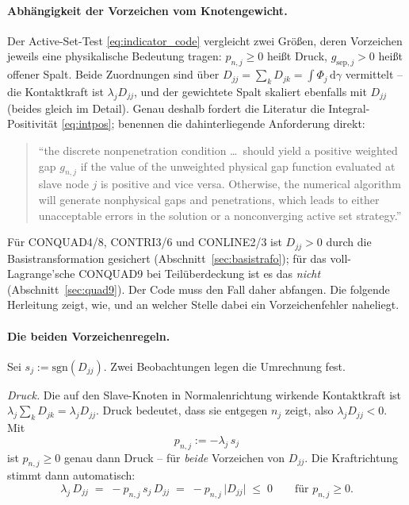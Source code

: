 \documentclass[a4paper,11pt]{article}
\def\bm#1{#1}%
\def\tilde#1{#1}%
\begin{document}
\paragraph{Abhängigkeit der Vorzeichen vom Knotengewicht.}
Der Active-Set-Test \eqref{eq:indicator_code} vergleicht zwei Größen, deren Vorzeichen jeweils eine
physikalische Bedeutung tragen: $p_{n,j}\ge0$ heißt Druck, $g_{\text{sep},j}>0$ heißt offener
Spalt. Beide Zuordnungen sind über $\tilde D_{jj}=\sum_k D_{jk}=\int\Phi_j\,\mathrm d\gamma$
vermittelt -- die Kontaktkraft ist $\lambda_j\tilde D_{jj}$, und der gewichtete Spalt skaliert
ebenfalls mit $\tilde D_{jj}$ (beides gleich im Detail). Genau deshalb fordert die Literatur die
Integral-Positivität \eqref{eq:intpos}; \citet[Abschn.~4.3]{popp2012} benennen die dahinterliegende
Anforderung direkt:
\begin{quote}
\small ``the discrete nonpenetration condition \ldots\ should yield a positive weighted gap
$\tilde g_{n,j}$ if the value of the unweighted physical gap function evaluated at slave node $j$
is positive and vice versa. Otherwise, the numerical algorithm will generate nonphysical gaps and
penetrations, which leads to either unacceptable errors in the solution or a nonconverging active
set strategy.'' \hfill \citep[Abschn.~4.3]{popp2012}
\end{quote}
Für CONQUAD4/8, CONTRI3/6 und CONLINE2/3 ist $\tilde D_{jj}>0$ durch die Basistransformation
gesichert (Abschnitt~\ref{sec:basistrafo}); für das voll-Lagrange'sche CONQUAD9 bei
Teilüberdeckung ist es das \emph{nicht} (Abschnitt~\ref{sec:quad9}). Der Code muss den Fall daher
abfangen. Die folgende Herleitung zeigt, wie, und an welcher Stelle dabei ein Vorzeichenfehler
naheliegt.

\paragraph{Die beiden Vorzeichenregeln.}
Sei $s_j:=\mathrm{sgn}(\tilde D_{jj})$. Zwei Beobachtungen legen die Umrechnung fest.

\emph{Druck.} Die auf den Slave-Knoten in Normalenrichtung wirkende Kontaktkraft ist
$\lambda_j\sum_k D_{jk}=\lambda_j\tilde D_{jj}$. Druck bedeutet, dass sie entgegen $\bm n_j$ zeigt,
also $\lambda_j\tilde D_{jj}<0$. Mit
\begin{equation}
p_{n,j} := -\lambda_j\,s_j
\label{eq:pn}
\end{equation}
ist $p_{n,j}\ge0$ genau dann Druck -- für \emph{beide} Vorzeichen von $\tilde D_{jj}$. Die
Kraftrichtung stimmt dann automatisch:
\begin{equation}
\lambda_j\,\tilde D_{jj} \;=\; -p_{n,j}\,s_j\,\tilde D_{jj} \;=\; -p_{n,j}\,\big|\tilde D_{jj}\big|
\;\le\;0 \qquad\text{für } p_{n,j}\ge0 .
\end{equation}
\end{document}
